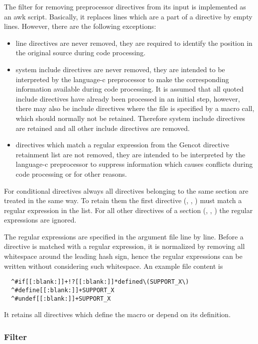 The filter for removing preprocessor directives from its input is implemented as an awk script.
Basically, it replaces lines which are a part of a directive by empty lines. However, there are the following
exceptions:
\begin{itemize}
\item line directives are never removed, they are required to identify the position in the original source
during code processing.
\item system include directives are never removed, they are intended to be interpreted by the language-c
preprocessor to make the corresponding information available during code processing. It is assumed that
all quoted include directives have already been processed in an initial step, however, there may also be 
include directives where the file is specified by a macro call, which should normally not be retained.
Therefore system include directives are retained and all other include directives are removed.
\item directives which match a regular expression from the Gencot directive retainment list are not removed, 
they are intended to be interpreted by the language-c preprocessor to suppress information which causes 
conflicts during code processing or for other reasons.
\end{itemize}

For conditional directives always all directives belonging to the same section are treated in the same way.
To retain them the first directive (, , ) must match a regular expression
in the list. For all other directives of a section (, , ) the 
regular expressions are ignored.

The regular expressions are specified in the argument file line by line. Before a directive is matched with 
a regular expression, it is normalized by removing all whitespace around the leading hash sign, hence the
regular expressions can be written without considering such whitespace. An example file content is
\begin{verbatim}
  ^#if[[:blank:]]+!?[[:blank:]]*defined\(SUPPORT_X\)
  ^#define[[:blank:]]+SUPPORT_X
  ^#undef[[:blank:]]+SUPPORT_X
\end{verbatim}
It retains all directives which define the macro  or depend on its definition.

\subsubsection{Filter }

